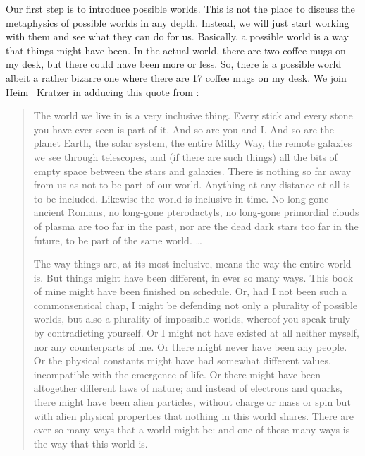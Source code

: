 Our first step is to introduce possible worlds. This is not the place
to discuss the metaphysics of possible worlds in any depth. Instead,
we will just start working with them and see what they can do for us.
Basically, a possible world is a way that things might have been. In
the actual world, there are two coffee mugs on my desk, but there
could have been more or less. So, there is a possible world \dash
albeit a rather bizarre one \dash where there are 17 coffee mugs on my
desk. We join Heim \amp\ Kratzer in adducing this quote from
\citet[1f.]{lewis:plurality:1986}:

\begin{quote}
  The world we live in is a very inclusive thing. Every stick and
  every stone you have ever seen is part of it. And so are you and I.
  And so are the planet Earth, the solar system, the entire Milky Way,
  the remote galaxies we see through telescopes, and (if there are
  such things) all the bits of empty space between the stars and
  galaxies. There is nothing so far away from us as not to be part of
  our world. Anything at any distance at all is to be included.
  Likewise the world is inclusive in time. No long-gone ancient
  Romans, no long-gone pterodactyls, no long-gone primordial clouds of
  plasma are too far in the past, nor are the dead dark stars too far
  in the future, to be part of the same world. \dots
	
  \medskip
	
  The way things are, at its most inclusive, means the way the entire
  world is. But things might have been different, in ever so many
  ways. This book of mine might have been finished on schedule. Or,
  had I not been such a commonsensical chap, I might be defending not
  only a plurality of possible worlds, but also a plurality of
  impossible worlds, whereof you speak truly by contradicting
  yourself. Or I might not have existed at all \dash neither myself,
  nor any counterparts of me. Or there might never have been any
  people. Or the physical constants might have had somewhat different
  values, incompatible with the emergence of life. Or there might have
  been altogether different laws of nature; and instead of electrons
  and quarks, there might have been alien particles, without charge or
  mass or spin but with alien physical properties that nothing in this
  world shares. There are ever so many ways that a world might be: and
  one of these many ways is the way that this world is.
\end{quote}
